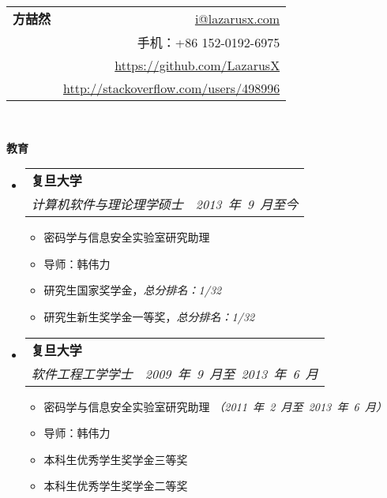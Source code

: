 \documentclass[letterpaper,10pt]{article}
\makeatletter
\newcommand{\resitem}[1]{\item #1 \vspace{-2pt}}
\newcommand{\resheading}[1]{{\large \colorbox{mygrey}{\begin{minipage}{\textwidth}{\textbf{#1 \vphantom{p\^{E}}}}\end{minipage}}}}
\newcommand{\ressubheading}[4]{
\begin{tabular*}{6.5in}{l@{\extracolsep{\fill}}r}
		\textbf{#1} & #2 \\
		#3 & #4 \\
\end{tabular*}\vspace{-6pt}}
\makeatother
\begin{document}
\newcommand{\mywebheader}{
\begin{tabular*}{7in}{l@{\extracolsep{\fill}}r}
	\textbf{{\Huge 方喆然}} & \href{mailto:i@lazarusx.com}{i@lazarusx.com}\\
     & {手机：+86 152-0192-6975}\\
     & \href{https://github.com/LazarusX}{https://github.com/LazarusX} \\
     & \href{http://stackoverflow.com/users/498996}{http://stackoverflow.com/users/498996} \\
	\end{tabular*}
\\
\vspace{0.1in}}

\mywebheader


\resheading{教育}
	\begin{itemize}
       \item
			\ressubheading{{复旦大学}}{}{\emph{计算机软件与理论理学硕士}}{\emph{2013~年~9~月至今}}
			{
				\begin{itemize}
                    
                    \resitem{密码学与信息安全实验室研究助理}
                    \resitem{导师：韩伟力}
                    \resitem{研究生国家奖学金，\emph{总分排名：1/32}}
                    \resitem{研究生新生奖学金一等奖，\emph{总分排名：1/32}}
				\end{itemize}
			}


    \item
			\ressubheading{{复旦大学}}{}{\emph{软件工程工学学士}}{\emph{2009~年~9~月至~2013~年~6~月}}
			{
				\begin{itemize}
                    
                    \resitem{密码学与信息安全实验室研究助理 \emph{（2011~年~2~月至~2013~年~6~月）}}
                    \resitem{导师：韩伟力}
                    \resitem{本科生优秀学生奖学金三等奖}
                    \resitem{本科生优秀学生奖学金二等奖}
				\end{itemize}
			}
	\end{itemize} %
\end{document}

